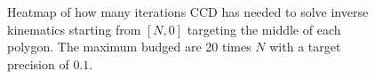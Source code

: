 \begin{figure}
    \begin{center}
        \hfill
        \hfill
    \end{center}
    \caption[CCD iteration heatmap]{Heatmap of how many iterations CCD has needed to solve inverse kinematics starting from $[N, 0]$ targeting the middle of each polygon. The maximum budged are 20 times $N$ with a target precision of $0.1$.}
    \label{fig:CCD_iteration}
\end{figure}
